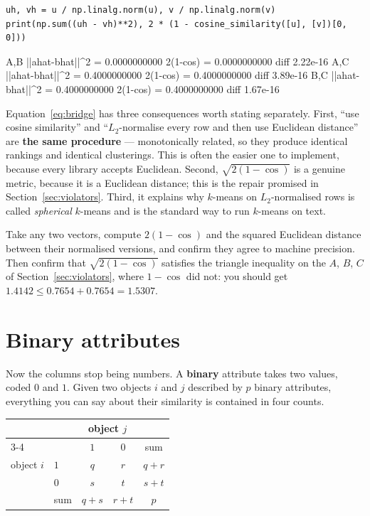 \documentclass[11pt]{article}
\begin{document}
\begin{lstlisting}
uh, vh = u / np.linalg.norm(u), v / np.linalg.norm(v)
print(np.sum((uh - vh)**2), 2 * (1 - cosine_similarity([u], [v])[0, 0]))
\end{lstlisting}
\begin{codeout}
A,B    ||ahat-bhat||^2 = 0.0000000000   2(1-cos) = 0.0000000000   diff 2.22e-16
A,C    ||ahat-bhat||^2 = 0.4000000000   2(1-cos) = 0.4000000000   diff 3.89e-16
B,C    ||ahat-bhat||^2 = 0.4000000000   2(1-cos) = 0.4000000000   diff 1.67e-16
\end{codeout}

Equation~\eqref{eq:bridge} has three consequences worth stating separately.
First, ``use cosine similarity'' and ``$L_2$-normalise every row and then use
Euclidean distance'' are \textbf{the same procedure} --- monotonically
related, so they produce identical rankings and identical clusterings. This
is often the easier one to implement, because every library accepts
Euclidean. Second, $\sqrt{2(1-\cos)}$ is a genuine metric, because it is a
Euclidean distance; this is the repair promised in
Section~\ref{sec:violators}. Third, it explains why $k$-means on
$L_2$-normalised rows is called \emph{spherical} $k$-means and is the
standard way to run $k$-means on text.

\begin{tryit}
Take any two vectors, compute $2(1-\cos)$ and the squared Euclidean distance
between their normalised versions, and confirm they agree to machine
precision. Then confirm that $\sqrt{2(1-\cos)}$ satisfies the triangle
inequality on the $A$, $B$, $C$ of Section~\ref{sec:violators}, where
$1-\cos$ did not: you should get
$1.4142 \le 0.7654 + 0.7654 = 1.5307$.
\end{tryit}

\section{Binary attributes}
\label{sec:binary}

Now the columns stop being numbers. A \textbf{binary} attribute takes two
values, coded $0$ and $1$. Given two objects $i$ and $j$ described by $p$
binary attributes, everything you can say about their similarity is contained
in four counts.

\begin{center}
\begin{tabular}{llccc}
  \toprule
  & & \multicolumn{2}{c}{object $j$} & \\
  \cmidrule(lr){3-4}
  & & $1$ & $0$ & sum \\
  \midrule
  \multicolumn{1}{l}{object $i$} & $1$ & $q$ & $r$ & $q+r$ \\
                                 & $0$ & $s$ & $t$ & $s+t$ \\
  \midrule
  & sum & $q+s$ & $r+t$ & $p$ \\
  \bottomrule
\end{tabular}
\end{center}
\end{document}
